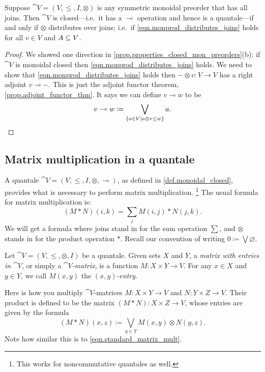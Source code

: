 \documentclass[7Sketches]{subfiles}
\begin{document}
\begin{proposition}%
\label{cor.closed_distrib_joins}%
%
Suppose $\cat{V}=(V,\leq,I,\otimes)$ is any symmetric monoidal preorder that has all joins. Then $\cat{V}$ is closed---i.e.\ it has a $\multimap$ operation and hence is a quantale---if and only if $\otimes$ distributes over joins; i.e.\ if \cref{eqn.monprod_distributes_joins} holds for all $v\in V$ and $A\ss V$.
\end{proposition}
\begin{proof}
We showed one direction in \cref{prop.properties_closed_mon_preorders}(b): if
$\cat{V}$ is monoidal closed then \cref{eqn.monprod_distributes_joins} holds. We
need to show that \cref{eqn.monprod_distributes_joins} holds then $-\otimes
v\colon V\to V$ has a right adjoint $v\multimap-$. This is just the adjoint
functor theorem, \cref{prop.adjoint_functor_thm}. It says we can define
$v\multimap w$ to be
\[
	v\multimap w\coloneqq\bigvee_{\{a\in V\mid a\otimes v\leq w\}}a.
	\qedhere
\]
\end{proof}

\subsection{Matrix multiplication in a quantale}%
\label{subsubsec.nav_matrix_mult}
%
A quantale $\cat{V}=(V,\leq,I,\otimes,\multimap)$, as defined in \cref{def.monoidal_closed}, provides what is necessary to perform matrix multiplication.%
\footnote{This works for noncommutative quantales as well.}
The usual formula for matrix multiplication is:
\begin{equation}%
\label{eqn.standard_matrix_mult}
(M*N)(i,k)=\sum_{j}M(i,j)*N(j,k).
\end{equation}
We will get a formula where joins stand in for the sum operation $\sum$, and $\otimes$ stands in for the product operation $*$. Recall our convention of writing $0\coloneqq\bigvee \varnothing$.


\begin{definition}%
Let $\cat{V}=(V,\leq,\otimes,I)$ be a quantale. Given sets $X$ and $Y$, a \emph{matrix with entries in $\cat{V}$}, or simply a \emph{$\cat{V}$-matrix}, is a function $M\colon X\times Y\to V$. For any $x\in X$ and $y\in Y$, we call $M(x,y)$ the \emph{$(x,y)$-entry}.
\end{definition}

%
Here is how you multiply $\cat{V}$-matrices $M\colon X\times Y\to V$ and $N\colon Y\times Z\to V$. Their product is defined to be the matrix $(M*N)\colon X\times Z\to V$, whose entries are given by the formula
\begin{equation}%
\label{eqn.quantale_matrix_mult}
	(M*N)(x,z)\coloneqq\bigvee_{y\in Y}M(x,y)\otimes N(y,z).
\end{equation}
Note how similar this is to \cref{eqn.standard_matrix_mult}.
\end{document}
